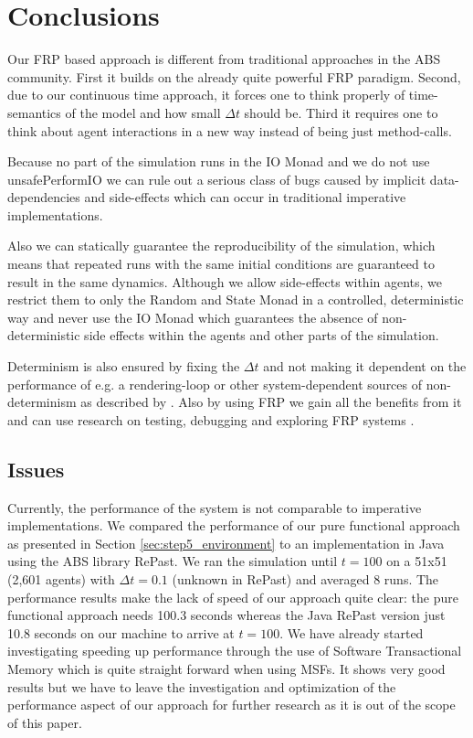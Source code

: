 \section{Conclusions}
\label{sec:conclusions}

Our FRP based approach is different from traditional approaches in the ABS community. First it builds on the already quite powerful FRP paradigm. Second, due to our continuous time approach, it forces one to think properly of time-semantics of the model and how small $\Delta t$ should be. Third it requires one to think about agent interactions in a new way instead of being just method-calls.

Because no part of the simulation runs in the IO Monad and we do not use unsafePerformIO we can rule out a serious class of bugs caused by implicit data-dependencies and side-effects which can occur in traditional imperative implementations.

Also we can statically guarantee the reproducibility of the simulation, which means that repeated runs with the same initial conditions are guaranteed to result in the same dynamics. Although we allow side-effects within agents, we restrict them to only the Random and State Monad in a controlled, deterministic way and never use the IO Monad which guarantees the absence of non-deterministic side effects within the agents and other parts of the simulation.

Determinism is also ensured by fixing the $\Delta t$ and not making it dependent on the performance of e.g. a rendering-loop or other system-dependent sources of non-determinism as described by \cite{perez_testing_2017}. Also by using FRP we gain all the benefits from it and can use research on testing, debugging and exploring FRP systems \cite{perez_testing_2017, perez_back_2017}.

\subsection*{Issues}
Currently, the performance of the system is not comparable to imperative implementations. We compared the performance of our pure functional approach as presented in Section \ref{sec:step5_environment} to an implementation in Java using the ABS library RePast. We ran the simulation until $t = 100$ on a 51x51 (2,601 agents) with $\Delta t = 0.1$ (unknown in RePast) and averaged 8 runs. The performance results make the lack of speed of our approach quite clear: the pure functional approach needs 100.3 seconds whereas the Java RePast version just 10.8 seconds on our machine to arrive at $t = 100$. We have already started investigating speeding up performance through the use of Software Transactional Memory \cite{harris_composable_2005, harris_transactional_2006} which is quite straight forward when using MSFs. It shows very good results but we have to leave the investigation and optimization of the performance aspect of our approach for further research as it is out of the scope of this paper.

